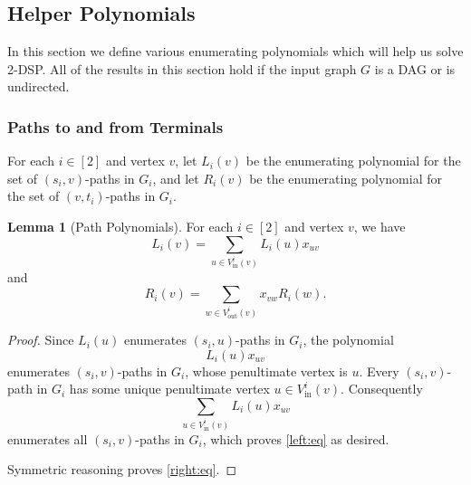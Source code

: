 \documentclass[11pt]{article}
\DeclareMathOperator{\disj}{disj}
\renewcommand{\t}{\text}
\newcommand{\vin}{V_{\t{in}}}
\newcommand{\vout}{V_{\t{out}}}
\theoremstyle{definition}
\newtheorem{lemma}[theorem]{Lemma}
\begin{document}

    


\subsection{Helper Polynomials}
\label{subsec:helpers}

In this section we define various enumerating polynomials which will help us solve \textsf{2-DSP}.
All of the results in this section hold if the input graph $G$ is a DAG or is undirected.

\subsubsection*{Paths to and from Terminals}

For each $i\in [2]$ and vertex $v$, 
let $L_i(v)$ be the enumerating polynomial for the set of $(s_i,v)$-paths in $G_i$, and let $R_i(v)$ be the enumerating polynomial for the set of $(v,t_i)$-paths in $G_i$.
\begin{lemma}[Path Polynomials]
    \label{lem:dp}
    For each $i\in [2]$ and vertex $v$, we have 
        \begin{equation}
        \label{left:eq}
        L_i(v) = \sum_{u\in \vin^{i}(v)} L_i(u)x_{uv} 
        \end{equation}
    and
        \begin{equation}
        \label{right:eq}
        R_i(v) = \sum_{w\in\vout^i(v)} x_{vw}R_i(w).
        \end{equation}
\end{lemma}
\begin{proof}
    Since $L_i(u)$ enumerates $(s_i,u)$-paths in $G_i$, the polynomial
        \[L_i(u)x_{uv}\]
    enumerates $(s_i,v)$-paths in $G_i$, whose penultimate vertex is $u$.
    Every $(s_i,v)$-path in $G_i$ has some unique penultimate vertex $u\in \vin^i(v)$.
    Consequently
    \[\sum_{u\in \vin^{i}(v)} L_i(u)x_{uv} \]
    enumerates all $(s_i,v)$-paths in $G_i$, which proves \cref{left:eq} as desired.
    
    Symmetric reasoning proves \cref{right:eq}.
\end{proof}
\end{document}
